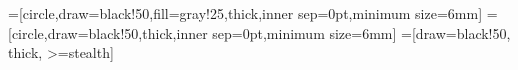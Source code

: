 %
%
%


=[circle,draw=black!50,fill=gray!25,thick,inner sep=0pt,minimum size=6mm]
=[circle,draw=black!50,thick,inner sep=0pt,minimum size=6mm]
=[draw=black!50, thick, >=stealth]


